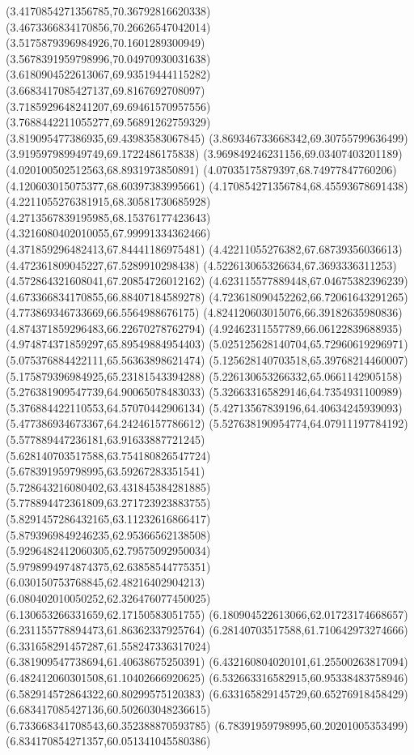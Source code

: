 {(3.4170854271356785,70.36792816620338)
(3.4673366834170856,70.26626547042014)
(3.5175879396984926,70.1601289300949)
(3.5678391959798996,70.04970930031638)
(3.6180904522613067,69.93519444115282)
(3.6683417085427137,69.8167692708097)
(3.7185929648241207,69.69461570957556)
(3.7688442211055277,69.56891262759329)
(3.819095477386935,69.43983583067845)
(3.869346733668342,69.30755799636499)
(3.919597989949749,69.1722486175838)
(3.969849246231156,69.03407403201189)
(4.020100502512563,68.8931973850891)
(4.07035175879397,68.74977847760206)
(4.120603015075377,68.60397383995661)
(4.170854271356784,68.45593678691438)
(4.2211055276381915,68.30581730685928)
(4.2713567839195985,68.15376177423643)
(4.3216080402010055,67.99991334362466)
(4.371859296482413,67.84441186975481)
(4.42211055276382,67.68739356036613)
(4.472361809045227,67.5289910298438)
(4.522613065326634,67.3693336311253)
(4.572864321608041,67.20854726012162)
(4.623115577889448,67.04675382396239)
(4.673366834170855,66.88407184589278)
(4.723618090452262,66.72061643291265)
(4.773869346733669,66.5564988676175)
(4.824120603015076,66.39182635980836)
(4.874371859296483,66.22670278762794)
(4.92462311557789,66.06122839688935)
(4.974874371859297,65.89549884954403)
(5.025125628140704,65.72960619296971)
(5.075376884422111,65.56363898621474)
(5.125628140703518,65.39768214460007)
(5.175879396984925,65.23181543394288)
(5.226130653266332,65.0661142905158)
(5.276381909547739,64.90065078483033)
(5.326633165829146,64.7354931100989)
(5.376884422110553,64.57070442906134)
(5.42713567839196,64.40634245939093)
(5.477386934673367,64.24246157786612)
(5.527638190954774,64.07911197784192)
(5.577889447236181,63.91633887721245)
(5.628140703517588,63.754180826547724)
(5.678391959798995,63.59267283351541)
(5.728643216080402,63.431845384281885)
(5.778894472361809,63.271723923883755)
(5.8291457286432165,63.11232616866417)
(5.8793969849246235,62.95366562138508)
(5.9296482412060305,62.79575092950034)
(5.9798994974874375,62.63858544775351)
(6.030150753768845,62.48216402904213)
(6.080402010050252,62.326476077450025)
(6.130653266331659,62.17150583051755)
(6.180904522613066,62.01723174668657)
(6.231155778894473,61.86362337925764)
(6.28140703517588,61.710642973274666)
(6.331658291457287,61.558247336317024)
(6.381909547738694,61.40638675250391)
(6.432160804020101,61.25500263817094)
(6.482412060301508,61.10402666920625)
(6.532663316582915,60.95338483758946)
(6.582914572864322,60.80299575120383)
(6.633165829145729,60.65276918458429)
(6.683417085427136,60.502603048236615)
(6.733668341708543,60.352388870593785)
(6.78391959798995,60.20201005353499)
(6.834170854271357,60.051341045580386)
}
